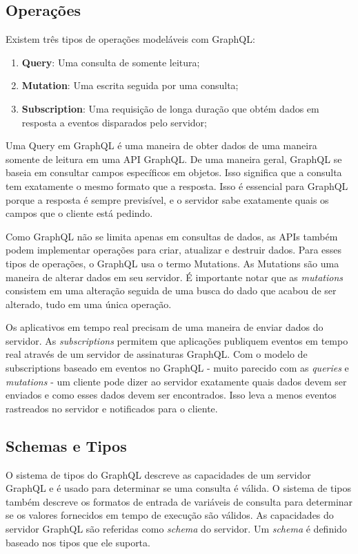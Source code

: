 \subsection{Operações}

Existem três tipos de operações modeláveis com GraphQL:

\begin{enumerate}[label=\alph*)]
\item \textbf{Query}: Uma consulta de somente leitura;
\item \textbf{Mutation}: Uma escrita seguida por uma consulta;
\item \textbf{Subscription}: Uma requisição de longa duração que obtém dados em resposta a eventos disparados pelo servidor;
\end{enumerate}

Uma Query em GraphQL é uma maneira de obter dados de uma maneira somente de leitura em uma API GraphQL. De uma maneira geral, GraphQL se baseia em consultar campos específicos em objetos. Isso significa que a consulta tem exatamente o mesmo formato que a resposta. Isso é essencial para GraphQL porque a resposta é sempre previsível, e o servidor sabe exatamente quais os campos que o cliente está pedindo.

Como GraphQL não se limita apenas em consultas de dados, as APIs também podem implementar operações para criar, atualizar e destruir dados. Para esses tipos de operações, o GraphQL usa o termo Mutations. As Mutations são uma maneira de alterar dados em seu servidor. É importante notar que as \textit{mutations} consistem em uma alteração seguida de uma busca do dado que acabou de ser alterado, tudo em uma única operação.

Os aplicativos em tempo real precisam de uma maneira de enviar dados do servidor. As \textit{subscriptions} permitem que aplicações publiquem eventos em tempo real através de um servidor de assinaturas GraphQL. Com o modelo de subscriptions baseado em eventos no GraphQL - muito parecido com as \textit{queries} e \textit{mutations} - um cliente pode dizer ao servidor exatamente quais dados devem ser enviados e como esses dados devem ser encontrados. Isso leva a menos eventos rastreados no servidor e notificados para o cliente.

\subsection{Schemas e Tipos}

O sistema de tipos do GraphQL descreve as capacidades de um servidor GraphQL e é usado para determinar se uma consulta é válida. O sistema de tipos também descreve os formatos de entrada de variáveis de consulta para determinar se os valores fornecidos em tempo de execução são válidos. As capacidades do servidor GraphQL são referidas como \textit{schema} do servidor. Um \textit{schema} é definido baseado nos tipos que ele suporta.

